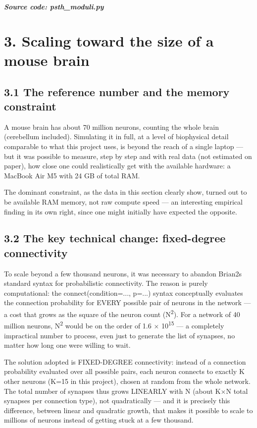 \documentclass[
  english,
]{article}
\begin{document}
\textit{\textbf{Source code: psth\_\allowbreak{}moduli.py}}


\section{3. Scaling toward the size of a mouse brain}\label{scaling-toward-the-size-of-a-mouse-brain}

\subsection{3.1 The reference number and the memory constraint}\label{the-reference-number-and-the-memory-constraint}

A mouse brain has about 70 million neurons, counting the whole brain (cerebellum included). Simulating it in full, at a level of biophysical detail comparable to what this project uses, is beyond the reach of a single laptop --- but it was possible to measure, step by step and with real data (not estimated on paper), how close one could realistically get with the available hardware: a MacBook Air M5 with 24 GB of total RAM.

The dominant constraint, as the data in this section clearly show, turned out to be available RAM memory, not raw compute speed --- an interesting empirical finding in its own right, since one might initially have expected the opposite.

\subsection{3.2 The key technical change: fixed-degree connectivity}\label{the-key-technical-change-fixed-degree-connectivity}

To scale beyond a few thousand neurons, it was necessary to abandon Brian2\textquotesingle s standard syntax for probabilistic connectivity. The reason is purely computational: the connect(condition=..., p=...) syntax conceptually evaluates the connection probability for EVERY possible pair of neurons in the network --- a cost that grows as the square of the neuron count (N\textsuperscript{2}). For a network of 40 million neurons, N\textsuperscript{2} would be on the order of 1.6 $\times$ 10\textsuperscript{1}\textsuperscript{5} --- a completely impractical number to process, even just to generate the list of synapses, no matter how long one were willing to wait.

The solution adopted is FIXED-DEGREE connectivity: instead of a connection probability evaluated over all possible pairs, each neuron connects to exactly K other neurons (K=15 in this project), chosen at random from the whole network. The total number of synapses thus grows LINEARLY with N (about K$\times$N total synapses per connection type), not quadratically --- and it is precisely this difference, between linear and quadratic growth, that makes it possible to scale to millions of neurons instead of getting stuck at a few thousand.
\end{document}
